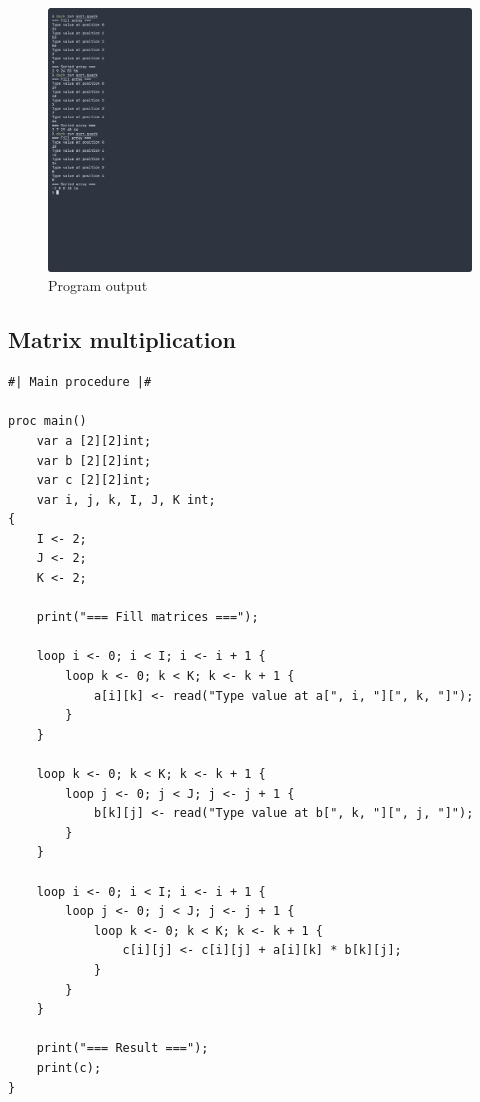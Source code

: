 \begin{figure}[H]
    \centering
    \caption{Program output}
    \includegraphics[width=\textwidth]{evidences/sort_output}
\end{figure}

\newpage

\subsection{Matrix multiplication}

\begin{verbatim}
#| Main procedure |#

proc main()
    var a [2][2]int;
    var b [2][2]int;
    var c [2][2]int;
    var i, j, k, I, J, K int;
{
    I <- 2;
    J <- 2;
    K <- 2;

    print("=== Fill matrices ===");

    loop i <- 0; i < I; i <- i + 1 {
        loop k <- 0; k < K; k <- k + 1 {
            a[i][k] <- read("Type value at a[", i, "][", k, "]");
        }
    }

    loop k <- 0; k < K; k <- k + 1 {
        loop j <- 0; j < J; j <- j + 1 {
            b[k][j] <- read("Type value at b[", k, "][", j, "]");
        }
    }

    loop i <- 0; i < I; i <- i + 1 {
        loop j <- 0; j < J; j <- j + 1 {
            loop k <- 0; k < K; k <- k + 1 {
                c[i][j] <- c[i][j] + a[i][k] * b[k][j];
            }
        }
    }

    print("=== Result ===");
    print(c);
}
\end{verbatim}

